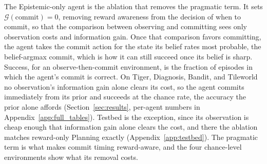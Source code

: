 The Epistemic-only agent is the ablation that removes the pragmatic term. It sets $\mathcal{G}(\text{commit}) = 0$, removing reward awareness from the decision of when to commit, so that the comparison between observing and committing sees only observation costs and information gain. Once that comparison favors committing, the agent takes the commit action for the state its belief rates most probable, the belief-argmax commit, which is how it can still succeed once its belief is sharp. Success, for an observe-then-commit environment, is the fraction of episodes in which the agent's commit is correct. On Tiger, Diagnosis, Bandit, and Tileworld no observation's information gain alone clears its cost, so the agent commits immediately from its prior and succeeds at the chance rate, the accuracy the prior alone affords (Section~\ref{sec:results}, per-agent numbers in Appendix~\ref{app:full_tables}). Testbed is the exception, since its observation is cheap enough that information gain alone clears the cost, and there the ablation matches reward-only Planning exactly (Appendix~\ref{app:testbed}). The pragmatic term is what makes commit timing reward-aware, and the four chance-level environments show what its removal costs.

